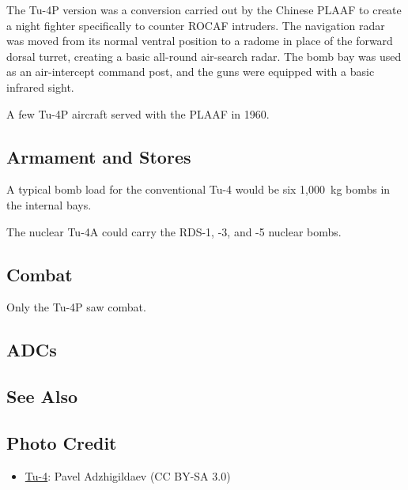 The Tu-4P version was a conversion carried out by the Chinese PLAAF to create a night fighter specifically to counter ROCAF intruders. The navigation radar was moved from its normal ventral position to a radome in place of the forward dorsal turret, creating a basic all-round air-search radar. The bomb bay was used as an air-intercept command post, and the guns were equipped with a basic infrared sight.

A few Tu-4P aircraft served with the PLAAF in 1960.

\subsection{Armament and Stores}

A typical bomb load for the conventional Tu-4 would be six 1,000~kg bombs in the internal bays.

The nuclear Tu-4A could carry the RDS-1, -3, and -5 nuclear bombs.

\subsection{Combat}

Only the Tu-4P saw combat.

\subsection{ADCs}
\begin{adclist}
\end{adclist}

\subsection{See Also}
\begin{typelist}
\end{typelist}

\subsection{Photo Credit}
\begin{itemize}\raggedright
    \item \href{https://commons.wikimedia.org/wiki/File:TU-4-MONIN0.jpg}{Tu-4}: Pavel Adzhigildaev (CC BY-SA 3.0)
\end{itemize}
